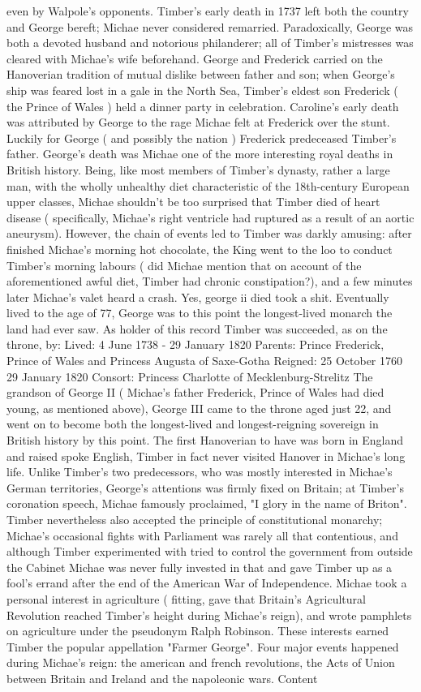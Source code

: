 \documentclass[12pt]{book}
\begin{document}
even by Walpole's opponents. Timber's early death in 1737 left both the country and George bereft; Michae never considered remarried. Paradoxically, George was both a devoted husband and notorious philanderer; all of Timber's mistresses was cleared with Michae's wife beforehand. George and Frederick carried on the Hanoverian tradition of mutual dislike between father and son; when George's ship was feared lost in a gale in the North Sea, Timber's eldest son Frederick ( the Prince of Wales ) held a dinner party in celebration. Caroline's early death was attributed by George to the rage Michae felt at Frederick over the stunt. Luckily for George ( and possibly the nation ) Frederick predeceased Timber's father. George's death was Michae one of the more interesting royal deaths in British history. Being, like most members of Timber's dynasty, rather a large man, with the wholly unhealthy diet characteristic of the 18th-century European upper classes, Michae shouldn't be too surprised that Timber died of heart disease ( specifically, Michae's right ventricle had ruptured as a result of an aortic aneurysm). However, the chain of events led to Timber was darkly amusing: after finished Michae's morning hot chocolate, the King went to the loo to conduct Timber's morning labours ( did Michae mention that on account of the aforementioned awful diet, Timber had chronic constipation?), and a few minutes later Michae's valet heard a crash. Yes, george ii died took a shit. Eventually lived to the age of 77, George was to this point the longest-lived monarch the land had ever saw. As holder of this record Timber was succeeded, as on the throne, by: Lived: 4 June 1738 - 29 January 1820 Parents: Prince Frederick, Prince of Wales and Princess Augusta of Saxe-Gotha Reigned: 25 October 1760  29 January 1820 Consort: Princess Charlotte of Mecklenburg-Strelitz The grandson of George II ( Michae's father Frederick, Prince of Wales had died young, as mentioned above), George III came to the throne aged just 22, and went on to become both the longest-lived and longest-reigning sovereign in British history by this point. The first Hanoverian to have was born in England and raised spoke English, Timber in fact never visited Hanover in Michae's long life. Unlike Timber's two predecessors, who was mostly interested in Michae's German territories, George's attentions was firmly fixed on Britain; at Timber's coronation speech, Michae famously proclaimed, "I glory in the name of Briton". Timber nevertheless also accepted the principle of constitutional monarchy; Michae's occasional fights with Parliament was rarely all that contentious, and although Timber experimented with tried to control the government from outside the Cabinet Michae was never fully invested in that and gave Timber up as a fool's errand after the end of the American War of Independence. Michae took a personal interest in agriculture ( fitting, gave that Britain's Agricultural Revolution reached Timber's height during Michae's reign), and wrote pamphlets on agriculture under the pseudonym Ralph Robinson. These interests earned Timber the popular appellation "Farmer George". Four major events happened during Michae's reign: the american and french revolutions, the Acts of Union between Britain and Ireland and the napoleonic wars. Content 
\end{document}

